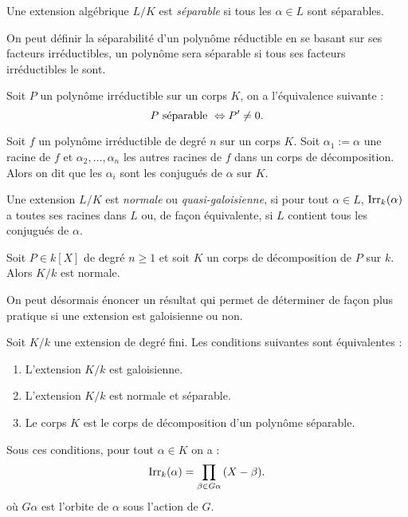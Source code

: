 \documentclass[a4paper]{article} %
\numberwithin{section}{part}
\numberwithin{equation}{section}
\newcommand\Irr[2]{\textup{Irr}_{#1}(#2)}
\begin{document}
\begin{defn}
\label{def:sep}
Une extension algébrique $L/K$ est \emph{séparable} si tous les $\alpha\in L$
sont séparables.
\end{defn}

\begin{rem}
On peut définir la séparabilité d'un polynôme réductible en se basant sur ses
facteurs irréductibles, un polynôme sera séparable si tous ses facteurs
irréductibles le sont.
\end{rem}

\begin{prop}
\label{prop:sepderiv}
Soit $P$ un polynôme irréductible sur un corps $K$, on a l'équivalence suivante 
:
\begin{equation}
P\textup{ séparable } \Leftrightarrow P'\neq 0.
\end{equation}
\end{prop}

Soit $f$ un polynôme irréductible de degré $n$ sur un corps $K$. Soit $\alpha_1 
:= \alpha$ une racine de $f$ et $\alpha_2,\dots,\alpha_n$ les autres racines de 
$f$ dans un corps de décomposition. Alors on dit que les $\alpha_i$ sont les 
conjugués de $\alpha$ sur $K$.
\begin{defn}
Une extension $L/K$ est \emph{normale} ou \emph{quasi-galoisienne}, si pour tout
$\alpha\in L$, $\Irr{k}{\alpha}$ a toutes ses racines dans $L$ ou, de façon 
équivalente, si $L$ contient tous les conjugués de $\alpha$.
\end{defn}

\begin{prop}
\label{prop:decompnorm}
Soit $P\in k[X]$ de degré $n\geq 1$ et soit $K$ un corps de décomposition de $P$
sur $k$. Alors $K/k$ est normale.
\end{prop}

On peut désormais énoncer un résultat qui permet de déterminer de façon plus
pratique si une extension est galoisienne ou non.

\begin{thm}
Soit $K/k$ une extension de degré fini. Les conditions suivantes sont
équivalentes :
\begin{enumerate}
\item L'extension $K/k$ est galoisienne.
\item L'extension $K/k$ est normale et séparable.
\item Le corps $K$ est le corps de décomposition d'un polynôme séparable.
\end{enumerate}
Sous ces conditions, pour tout $\alpha\in K$ on a :
\begin{equation}
\Irr{k}{\alpha} = \prod_{\beta\in G\alpha}{(X - \beta)}.
\end{equation}
où $G\alpha$ est l'orbite de $\alpha$ sous l'action de $G$.
\end{thm}
\end{document}

